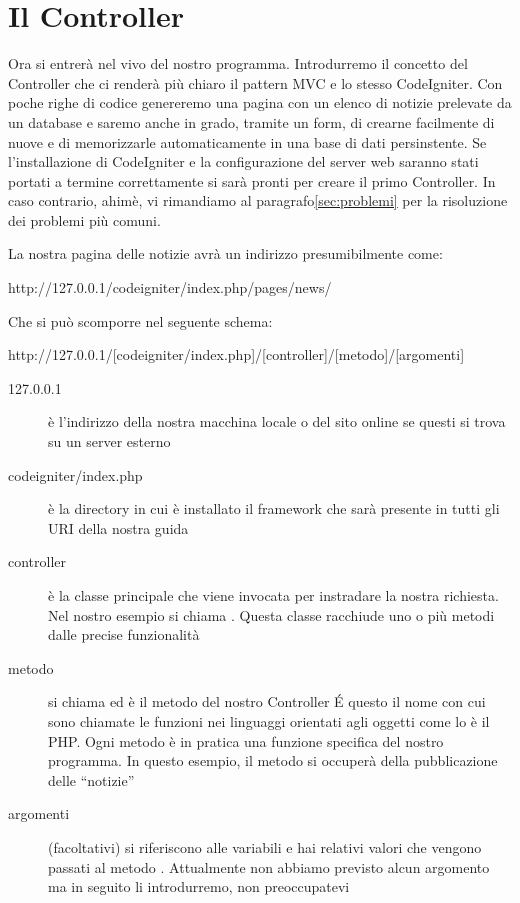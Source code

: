 \section{Il Controller}
\label{cap:controller}

Ora si entrerà nel vivo del nostro programma. Introdurremo il concetto del Controller che ci renderà più chiaro il pattern \ac{MVC} e lo stesso CodeIgniter. Con poche righe di codice genereremo una pagina con un elenco di notizie prelevate da un database e saremo anche in grado, tramite un form, di crearne facilmente di nuove e di memorizzarle automaticamente in una base di dati persinstente. Se l'installazione di CodeIgniter e la configurazione del server web saranno stati portati a termine correttamente si sarà pronti per creare il primo Controller. In caso contrario, ahimè, vi rimandiamo al paragrafo\vref{sec:problemi} per la risoluzione dei problemi più comuni.

La nostra pagina delle notizie avrà un indirizzo presumibilmente come:

\begin{code}
http://127.0.0.1/codeigniter/index.php/pages/news/
\end{code}

Che si può scomporre nel seguente schema:

\label{sec:urisintassi}
\begin{code}
http://127.0.0.1/[codeigniter/index.php]/[controller]/[metodo]/[argomenti]
\end{code}


\begin{description}
\item [127.0.0.1] è l'indirizzo della nostra macchina locale o del sito online se questi si trova su un server esterno
\item [codeigniter/index.php] è la directory in cui è installato il framework che sarà presente in tutti gli \ac{URI} della nostra guida
\item [controller] è la classe principale che viene invocata per instradare la nostra richiesta. Nel nostro esempio si chiama . Questa classe racchiude uno o più metodi dalle precise funzionalità
\item [metodo] si chiama  ed è il metodo del nostro Controller  \'E questo il nome con cui sono chiamate le funzioni nei linguaggi orientati agli oggetti come lo è il \ac{PHP}. Ogni metodo è in pratica una funzione specifica del nostro programma. In questo esempio, il metodo  si occuperà della pubblicazione delle ``notizie''
\item [argomenti] (facoltativi) si riferiscono alle variabili e hai relativi valori che vengono passati al metodo . Attualmente non abbiamo previsto alcun argomento ma in seguito li introdurremo, non preoccupatevi
\end{description}

